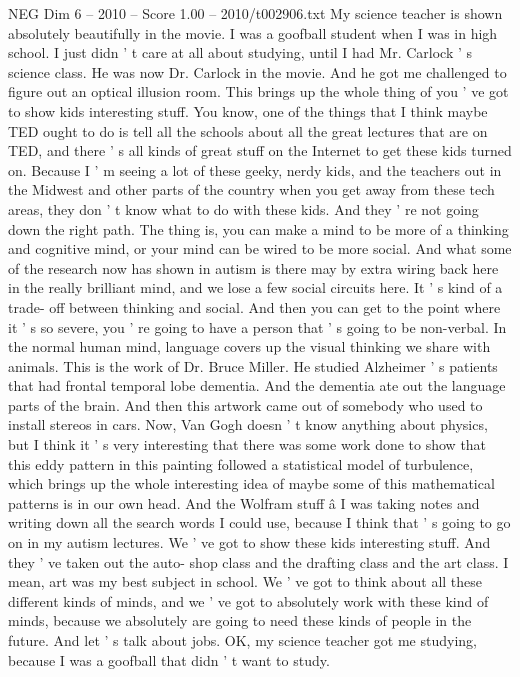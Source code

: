 \begin{textsample}{NEG Dim 6 – 2010 – Score 1.00 – 2010/t002906.txt}
My science teacher is shown absolutely beautifully in the movie.
I was a goofball student when I was in high school.
I just didn ' t care at all about studying, until I had Mr.
Carlock ' s science class.
He was now Dr.
Carlock in the movie.
And he got me challenged to figure out an optical illusion room.
This brings up the whole thing of you ' ve got to show kids interesting stuff.
You know, one of the things that I think maybe TED ought to do is tell all the schools about all the great lectures that are on TED, and there ' s all kinds of great stuff on the Internet to get these kids turned on.
Because I ' m seeing a lot of these geeky, nerdy kids, and the teachers out in the Midwest and other parts of the country when you get away from these tech areas, they don ' t know what to do with these kids.
And they ' re not going down the right path.
The thing is, you can make a mind to be more of a thinking and cognitive mind, or your mind can be wired to be more social.
And what some of the research now has shown in autism is there may by extra wiring back here in the really brilliant mind, and we lose a few social circuits here.
It ' s kind of a trade- off between thinking and social.
And then you can get to the point where it ' s so severe, you ' re going to have a person that ' s going to be non-verbal.
In the normal human mind, language covers up the visual thinking we share with animals.
This is the work of Dr.
Bruce Miller.
He studied Alzheimer ' s patients that had frontal temporal lobe dementia.
And the dementia ate out the language parts of the brain.
And then this artwork came out of somebody who used to install stereos in cars.
Now, Van Gogh doesn ' t know anything about physics, but I think it ' s very interesting that there was some work done to show that this eddy pattern in this painting followed a statistical model of turbulence, which brings up the whole interesting idea of maybe some of this mathematical patterns is in our own head.
And the Wolfram stuff â I was taking notes and writing down all the search words I could use, because I think that ' s going to go on in my autism lectures.
We ' ve got to show these kids interesting stuff.
And they ' ve taken out the auto- shop class and the drafting class and the art class.
I mean, art was my best subject in school.
We ' ve got to think about all these different kinds of minds, and we ' ve got to absolutely work with these kind of minds, because we absolutely are going to need these kinds of people in the future.
And let ' s talk about jobs.
OK, my science teacher got me studying, because I was a goofball that didn ' t want to study.

\end{textsample}
